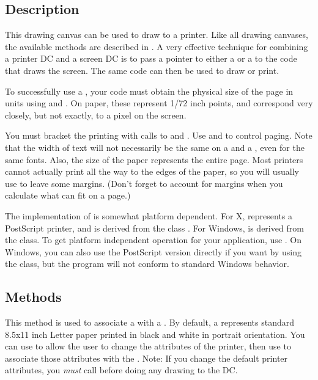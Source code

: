 \subsection* {Description}

This drawing canvas can be used to draw to a printer. Like
all drawing canvases, the available methods are described
in . A very effective technique for combining a printer
DC and a screen DC is to pass a pointer to either a 
or a  to the code that draws the screen. The same
code can then be used to draw or print.

To successfully use a , your code must
obtain the physical size of the page in units using
 and . On
paper, these represent 1/72 inch points, and correspond
very closely, but not exactly, to a pixel on the screen.

You must bracket the printing with calls to 
and . Use  and 
to control paging. Note that the width of text will not
necessarily be the same on a  and a ,
even for the same fonts. Also, the size of the paper represents
the entire page. Most printers cannot actually print all the way
to the edges of the paper, so you will usually use 
to leave some margins. (Don't forget to account for margins when
you calculate what can fit on a page.)

The implementation of  is somewhat platform
dependent. For X,  represents a PostScript
printer, and is derived from the class . For
Windows,  is derived from the 
class. To get platform independent operation for your
application, use . On Windows, you can also use
the PostScript version directly if you want by using the 
class, but the program will not conform to standard Windows
behavior.

\subsection* {Methods}


This method is used to associate a  with
a .
By default, a  represents standard
8.5x11 inch Letter paper printed in black and white in
portrait orientation. You can use  to allow
the user to change the attributes of the printer, then use
 to associate those attributes with the .
Note: If you change the default printer attributes, you \emph{must}
call  before doing any drawing to the DC.


